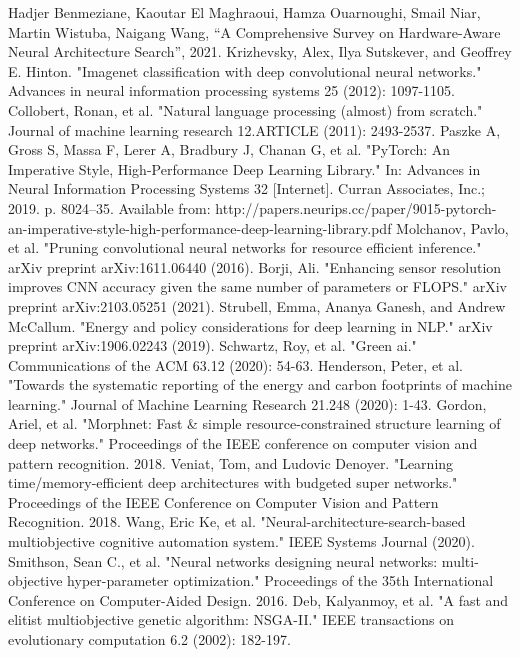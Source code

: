 \documentclass[conference]{IEEEtran}
\begin{document}
\begin{thebibliography}{00}
 Hadjer Benmeziane, Kaoutar El Maghraoui, Hamza Ouarnoughi, Smail Niar, Martin Wistuba, Naigang Wang, ``A Comprehensive Survey on Hardware-Aware Neural Architecture Search'', 2021.
 Krizhevsky, Alex, Ilya Sutskever, and Geoffrey E. Hinton. "Imagenet classification with deep convolutional neural networks." Advances in neural information processing systems 25 (2012): 1097-1105.
 Collobert, Ronan, et al. "Natural language processing (almost) from scratch." Journal of machine learning research 12.ARTICLE (2011): 2493-2537.
 Paszke A, Gross S, Massa F, Lerer A, Bradbury J, Chanan G, et al. "PyTorch: An Imperative Style, High-Performance Deep Learning Library." In: Advances in Neural Information Processing Systems 32 [Internet]. Curran Associates, Inc.; 2019. p. 8024–35. Available from: http://papers.neurips.cc/paper/9015-pytorch-an-imperative-style-high-performance-deep-learning-library.pdf
 Molchanov, Pavlo, et al. "Pruning convolutional neural networks for resource efficient inference." arXiv preprint arXiv:1611.06440 (2016).
 Borji, Ali. "Enhancing sensor resolution improves CNN accuracy given the same number of parameters or FLOPS." arXiv preprint arXiv:2103.05251 (2021).
 Strubell, Emma, Ananya Ganesh, and Andrew McCallum. "Energy and policy considerations for deep learning in NLP." arXiv preprint arXiv:1906.02243 (2019).
 Schwartz, Roy, et al. "Green ai." Communications of the ACM 63.12 (2020): 54-63.
 Henderson, Peter, et al. "Towards the systematic reporting of the energy and carbon footprints of machine learning." Journal of Machine Learning Research 21.248 (2020): 1-43.
 Gordon, Ariel, et al. "Morphnet: Fast \& simple resource-constrained structure learning of deep networks." Proceedings of the IEEE conference on computer vision and pattern recognition. 2018.
 Veniat, Tom, and Ludovic Denoyer. "Learning time/memory-efficient deep architectures with budgeted super networks." Proceedings of the IEEE Conference on Computer Vision and Pattern Recognition. 2018.
 Wang, Eric Ke, et al. "Neural-architecture-search-based multiobjective cognitive automation system." IEEE Systems Journal (2020).
 Smithson, Sean C., et al. "Neural networks designing neural networks: multi-objective hyper-parameter optimization." Proceedings of the 35th International Conference on Computer-Aided Design. 2016.
 Deb, Kalyanmoy, et al. "A fast and elitist multiobjective genetic algorithm: NSGA-II." IEEE transactions on evolutionary computation 6.2 (2002): 182-197.
\end{thebibliography}
\end{document}
